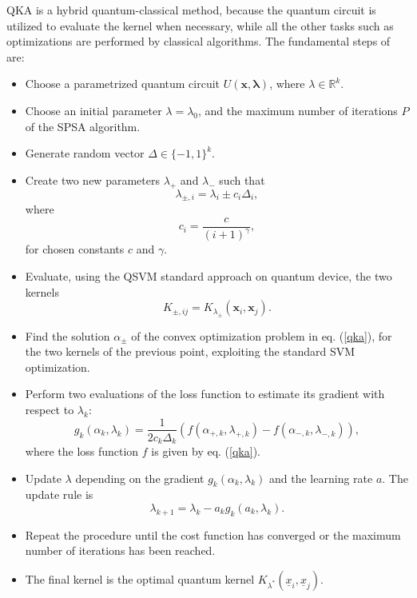 \documentclass[12pt]{article}
\begin{document}
QKA is a hybrid quantum-classical method, because the quantum circuit is utilized to evaluate the kernel when necessary, while all the other tasks such as optimizations are performed by classical algorithms. The fundamental steps of are:
\begin{itemize}
    \item Choose a parametrized quantum circuit $U(\mathbf{x}, \mathbf{\lambda})$, where $\lambda\in \mathbb{R}^k$.
    \item Choose an initial parameter $\lambda=\lambda_0$, and the maximum number of iterations $P$ of the SPSA algorithm.
    \item Generate random vector $\Delta \in \{-1,1\}^k$.
    \item Create two new parameters $\lambda_+$ and $\lambda_-$ such that $$\lambda_{\pm,i}=\lambda_i\pm c_i \Delta_i,$$ where $$c_i=\frac{c}{(i+1)^\gamma},$$ for chosen constants $c$ and $\gamma$. 
    \item Evaluate, using the QSVM standard approach on quantum device, the two kernels $$K_{\pm,ij}=K_{\lambda_{\pm}}(\mathbf{x}_i, \mathbf{x}_j).$$
    \item Find the solution $\alpha_{\pm}$ of the convex optimization problem in eq. (\ref{qka}), for the two kernels of the previous point, exploiting the standard SVM optimization.
    \item Perform two evaluations of the loss function to estimate its gradient with respect to $\lambda_k$: \begin{equation}
        g_k(\alpha_k, \lambda_k)=\frac{1}{2c_k\Delta_k}(f(\alpha_{+,k}, \lambda_{+,k})-f(\alpha_{-,k}, \lambda_{-,k})),
    \end{equation} where the loss function $f$ is given by eq. (\ref{qka}).
    \item Update $\lambda$ depending on the gradient $g_k(\alpha_k, \lambda_k)$ and the learning rate $a$. The update rule is \begin{equation}
        \lambda_{k+1}=\lambda_k-a_kg_k(a_k,\lambda_k).
    \end{equation}
    \item Repeat the procedure until the cost function has converged or the maximum number of iterations has been reached. 
    \item The final kernel is the optimal quantum kernel $K_{\lambda^*}(\underline{x}_i, \underline{x}_j).$
\end{itemize}
\end{document}
